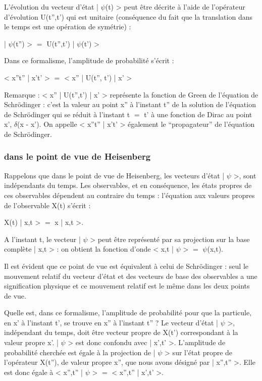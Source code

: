L'évolution du vecteur d'état | $\psi$(t) > peut être décrite à l'aide
de l'opérateur d'évolution U(t'',t') qui est unitaire (conséquence du fait
que la translation dans le temps est une opération de symétrie) :
\begin{center}
| $\psi$(t'') > $=$ U(t'',t') | $\psi$(t') >
\end{center}

Dans ce formalisme, l'amplitude de probabilité s'écrit :
\begin{center}
< x''t'' | x't' > $=$ < x'' | U(t'', t') | x' >
\end{center}

Remarque : < x'' | U(t'',t') | x' > représente la fonction de Green
de l'équation de Schrödinger : c'est la valeur au point x'' à l'instant t''
de la solution de l'équation de Schrödinger qui se réduit à l'instant
t $=$ t' à une fonction de Dirac au point x', $\delta$(x - x'). On appelle
< x''t'' | x't' > également le “propagateur'' de l'équation de Schrödinger.

\subsubsection{dans le point de vue de Heisenberg}

Rappelons que dans le point de vue de Heisenberg, les vecteurs
d'état | $\psi$ >, sont indépendants du temps. Les observables, et en conséquence,
les états propres de ces observables dépendent au contraire du
temps : l'équation aux valeurs propres de l'observable X(t) s'écrit :

X(t) | x,t > $=$ x | x,t >.

A l'instant t, le vecteur | $\psi$ > peut être représenté par sa projection
sur la base complète | x,t > : on obtient la fonction d'onde
< x,t | $\psi$ > $=$ $\psi$(x,t).

Il est évident que ce point de vue est équivalent à celui de
Schrödinger : seul le mouvement relatif du vecteur d'état et des vecteurs
de base des observables a une signification physique et ce mouvement
relatif est le même dans les deux points de vue.

Quelle est, dans ce formalisme, l'amplitude de probabilité pour
que la particule, en x' à l'instant t', se trouve en x'' à l'instant t'' ?
Le vecteur d'état | $\psi$ >, indépendant du temps, doit être vecteur propre
de X(t') correspondant à la valeur propre x'. | $\psi$ > est donc confondu
avec | x',t' >. L'amplitude de probabilité cherchée est égale à la projection
de | $\psi$ > sur l'état propre de l'opérateur X(t''), de valeur propre
x'', que nous avons désigné par | x'',t'' >. Elle est donc égale à
< x'',t'' | $\psi$ > $=$ < x'',t'' | x',t' >.

